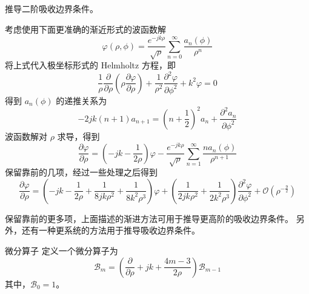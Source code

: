 \begin{exercise}
    推导二阶吸收边界条件。
\end{exercise}

\begin{solution}
    考虑使用下面更准确的渐近形式的波函数解
    \begin{equation*}
        \varphi(\rho,\phi)=
        \frac{e^{-jk\rho}}{\sqrt{\rho}}
        \sum_{n=0}^{\infty}\frac{a_n(\phi)}{\rho^n}
    \end{equation*}
    将上式代入极坐标形式的 Helmholtz 方程，即
    \begin{equation*}
        \frac{1}{\rho}\frac{\partial}{\partial \rho}
        \left(
            \rho\frac{\partial \varphi}{\partial \rho}
        \right)
        +\frac{1}{\rho^2}\frac{\partial^2 \varphi}{\partial \phi^2}
        +k^2\varphi=0
    \end{equation*}
    得到 $a_n(\phi)$ 的递推关系为
    \begin{equation*}
        -2jk(n+1)a_{n+1}=
        \left(n+\frac{1}{2}\right)^2
        a_n+\frac{\partial^2 a_n}{\partial \phi^2}
    \end{equation*}
    波函数解对 $\rho$ 求导，得到
    \begin{equation*}
        \frac{\partial \varphi}{\partial \rho}
        =\left(
            -jk-\frac{1}{2\rho}
        \right)\varphi
        -\frac{e^{-jk\rho}}{\sqrt{\rho}}
        \sum_{n=1}^{\infty}\frac{n a_n(\phi)}{\rho^{n+1}}
    \end{equation*}
    保留靠前的几项，经过一些处理之后得到
    \begin{equation*}
        \frac{\partial \varphi}{\partial \rho}
        =
        \left(
            -jk-\frac{1}{2\rho}
            +\frac{1}{8jk\rho^2}
            +\frac{1}{8k^2\rho^3}
        \right)\varphi
        +\left(
            \frac{1}{2jk\rho^2}
            +\frac{1}{2k^2\rho^3}
        \right)\frac{\partial^2 \varphi}{\partial \phi^2}
        +\mathcal{O}\left(\rho^{-\frac{9}{2}}\right)
    \end{equation*}
\end{solution}

\par 保留靠前的更多项，上面描述的渐进方法可用于推导更高阶的吸收边界条件。
另外，还有一种更系统的方法用于推导吸收边界条件。

\begin{definition}{微分算子}
    定义一个微分算子为
    \begin{equation}
        \mathcal{B}_m=
        \left(
            \frac{\partial}{\partial \rho}
            +jk+\frac{4m-3}{2\rho}
        \right)\mathcal{B}_{m-1}
    \end{equation}
    其中，$\mathcal{B}_0=1$。
\end{definition}

